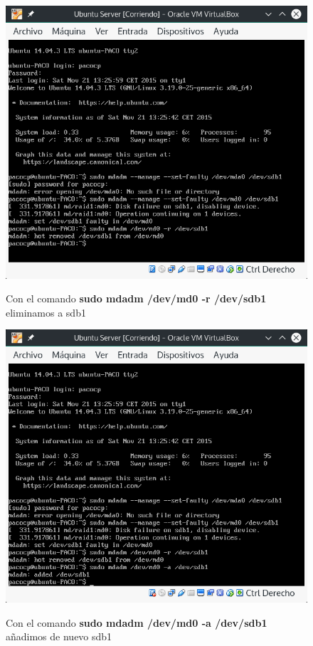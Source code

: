 \begin{figure}[H] %
	\centering
	\includegraphics[scale=0.5]{figuras/figura35.png}  %
	\label{figura35}
	
	\caption{Con el comando \textbf{sudo mdadm /dev/md0 -r /dev/sdb1} eliminamos a sdb1} 
\end{figure}

\begin{figure}[H] %
	\centering
	\includegraphics[scale=0.5]{figuras/figura36.png}  %
	\label{figura36}
	
	\caption{Con el comando \textbf{sudo mdadm /dev/md0 -a /dev/sdb1} añadimos de nuevo sdb1} 
\end{figure}

